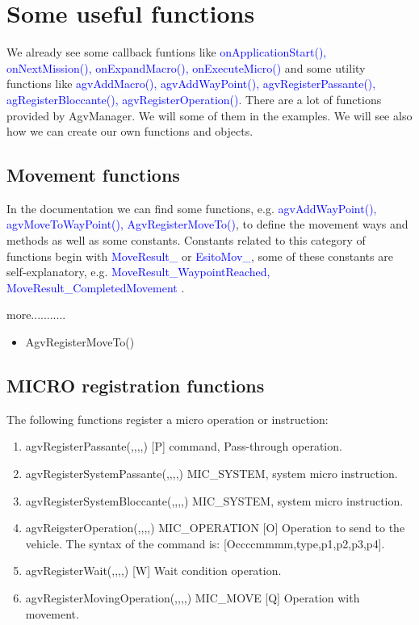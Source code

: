 \section{Some useful functions}
We already see some callback funtions like \textcolor{blue}{onApplicationStart(), onNextMission(), onExpandMacro(), onExecuteMicro()} and some utility functions like \textcolor{blue}{agvAddMacro(), agvAddWayPoint(), agvRegisterPassante(), agRegisterBloccante(), agvRegisterOperation()}. There are a lot of functions provided by AgvManager. We will some of them in the examples. We will see also how we can create our own functions and objects.

%
\subsection{Movement functions}
In the documentation we can find some functions, e.g. \textcolor{blue}{agvAddWayPoint(), agvMoveToWayPoint(), AgvRegisterMoveTo()}, to define the movement ways and methods as well as some constants.
Constants related to this category of functions begin with \textcolor{blue}{MoveResult\_} or \textcolor{blue}{EsitoMov\_}, some of these constants are self-explanatory, e.g. \textcolor{blue}{MoveResult\_WaypointReached, MoveResult\_CompletedMovement }.

more...........
\begin{itemize}
	\item AgvRegisterMoveTo()
\end{itemize}

%
\subsection{MICRO registration functions}
The following functions register a micro operation or instruction:\\

\begin{enumerate}
	\item agvRegisterPassante(,,,,) [P] command, Pass-through operation.\\
	
	\item agvRegisterSystemPassante(,,,,) MIC\_SYSTEM, system micro instruction.
	\item agvRegisterSystemBloccante(,,,,) MIC\_SYSTEM, system micro instruction.\\
	
	\item agvReigsterOperation(,,,,) MIC\_OPERATION [O] Operation to send to the vehicle. The syntax of the command is: [Occccmmmm,type,p1,p2,p3,p4].\\
	
	\item agvRegisterWait(,,,,) [W] Wait condition operation.\\
	
	\item agvRegisterMovingOperation(,,,,) MIC\_MOVE [Q] Operation with movement.\\
\end{enumerate}

